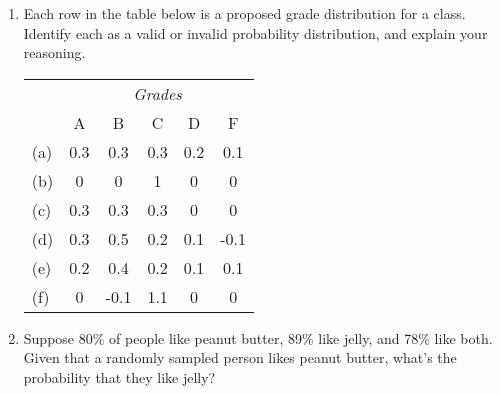 \documentclass{article}\usepackage[]{graphicx}\usepackage[]{color}
\begin{document}
\begin{enumerate}
\item Each row in the table below is a proposed grade distribution for a class. Identify each as a valid or invalid probability distribution, and explain your reasoning.
\begin{center}
\begin{tabular}{l  ccccc} 
  & \multicolumn{5}{c}{\textit{Grades}} \\
\cline{2-6}
	& A		& B 		& C 		& D		& F  \\
\cline{2-6}
(a) 	& 0.3 	& 0.3 	& 0.3 	& 0.2 	& 0.1\\
(b) 	& 0	 	& 0	 	& 1		& 0		& 0 \\
(c) 	& 0.3 	& 0.3 	& 0.3		& 0		& 0 \\
(d) 	& 0.3 	& 0.5 	& 0.2		& 0.1		& -0.1 \\
(e) 	& 0.2 	& 0.4 	& 0.2		& 0.1		& 0.1 \\
(f) 	& 0	 	& -0.1 	& 1.1		& 0		& 0 \\
\end{tabular}
\end{center}


\item Suppose 80\% of people like peanut butter, 89\% like jelly, and 78\% like both. Given that a randomly sampled person likes peanut butter, what's the probability that they like jelly?
% 
% 


\end{enumerate}
\end{document}
